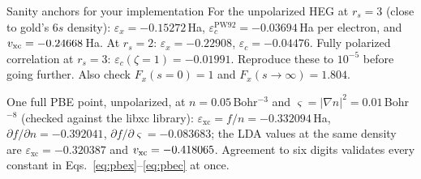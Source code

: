\begin{keybox}{Sanity anchors for your implementation}
For the unpolarized HEG at $r_s = 3$ (close to gold's $6s$ density):
$\varepsilon_x = -0.15272$\,Ha, $\varepsilon_c^{\mathrm{PW92}} =
-0.03694$\,Ha per electron, and $v_{\mathrm{xc}} = -0.24668$\,Ha. At $r_s=2$:
$\varepsilon_x = -0.22908$, $\varepsilon_c = -0.04476$. Fully polarized
correlation at $r_s = 3$: $\varepsilon_c(\zeta{=}1) = -0.01991$. Reproduce
these to $10^{-5}$ before going further. Also check $F_x(s\!=\!0)=1$ and
$F_x(s\to\infty)=1.804$.

One full PBE point, unpolarized, at $n = 0.05$\,Bohr$^{-3}$ and
$\varsigma = |\nabla n|^2 = 0.01$\,Bohr$^{-8}$ (checked against the libxc library):
$\varepsilon_{\mathrm{xc}} = f/n = -0.332094$\,Ha,
$\partial f/\partial n = -0.392041$,
$\partial f/\partial\varsigma = -0.083683$; the LDA values at the same
density are $\varepsilon_{\mathrm{xc}} = -0.320387$ and
$v_{\mathrm{xc}} = -0.418065$. Agreement to six digits validates every constant in
Eqs.~\eqref{eq:pbex}--\eqref{eq:pbec} at once.
\end{keybox}
